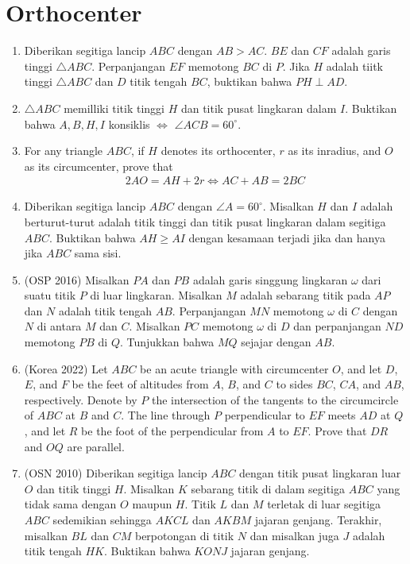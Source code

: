 \documentclass[11pt]{scrartcl}
\begin{document}
\section{Orthocenter}
\begin{enumerate}
\item Diberikan segitiga lancip $ABC$ dengan $AB>AC$. $BE$ dan $CF$ adalah garis tinggi $\triangle ABC$. Perpanjangan $EF$ memotong $BC$ di $P$. Jika $H$ adalah tiitk tinggi $\triangle ABC$ dan $D$ titik tengah $BC$, buktikan bahwa $PH \perp 
 AD$.
 
 \item $\triangle ABC$ memilliki titik tinggi $H$ dan titik pusat lingkaran dalam $I$. Buktikan bahwa $A,B,H,I$ konsiklis $\iff$ $\angle ACB = 60^\circ$.

 \item For any triangle $ABC$, if $H$ denotes its orthocenter, $r$ as its inradius, and $O$ as its circumcenter, prove that 
 \begin{align*}
     2AO = AH + 2r \iff AC+AB=2BC
 \end{align*}

 \item Diberikan segitiga lancip $ABC$ dengan $\angle A = 60^\circ$. Misalkan $H$ dan $I$ adalah berturut-turut adalah titik tinggi dan titik pusat lingkaran dalam segitiga $ABC$. Buktikan bahwa $AH \ge AI$ dengan kesamaan terjadi jika dan hanya jika $ABC$ sama sisi.

 \item (OSP 2016) Misalkan $PA$ dan $PB$ adalah garis singgung lingkaran $\omega$ dari suatu titik $P$ di luar lingkaran. Misalkan $M$ adalah sebarang titik pada $AP$ dan $N$ adalah titik tengah $AB$. Perpanjangan $MN$ memotong $\omega$ di $C$ dengan $N$ di antara $M$ dan $C$. Misalkan $PC$ memotong $\omega$ di $D$ dan perpanjangan $ND$ memotong $PB$ di $Q$. Tunjukkan bahwa $MQ$ sejajar dengan $AB$.

\item (Korea 2022) Let $ABC$ be an acute triangle with circumcenter $O$, and let $D$, $E$, and $F$ be the feet of altitudes from $A$, $B$, and $C$ to sides $BC$, $CA$, and $AB$, respectively. Denote by $P$ the intersection of the tangents to the circumcircle of $ABC$ at $B$ and $C$. The line through $P$ perpendicular to $EF$ meets $AD$ at $Q$, and let $R$ be the foot of the perpendicular from $A$ to $EF$. Prove that $DR$ and $OQ$ are parallel.

\item (OSN 2010) Diberikan segitiga lancip $ABC$ dengan titik pusat lingkaran luar $O$ dan titik tinggi $H$. Misalkan $K$ sebarang titik di dalam segitiga $ABC$ yang tidak sama dengan $O$ maupun $H$. Titik $L$ dan $M$ terletak di luar segitiga $ABC$ sedemikian sehingga $AKCL$ dan $AKBM$ jajaran genjang. Terakhir, misalkan $BL$ dan $CM$ berpotongan di titik $N$ dan misalkan juga $J$ adalah titik tengah $HK$. Buktikan bahwa $KONJ$ jajaran genjang.
 \end{enumerate}
 
\end{document}
